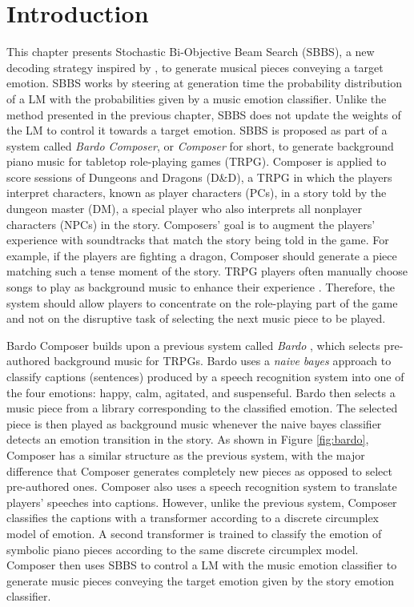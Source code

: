\section{Introduction}

This chapter presents Stochastic Bi-Objective Beam Search (SBBS), a new decoding strategy inspired by \citet{holtzman2018learning}, to generate musical pieces conveying a target emotion. SBBS works by steering at generation time the probability distribution of a LM with the probabilities given by a music emotion classifier. Unlike the method presented in the previous chapter, SBBS does not update the weights of the LM to control it towards a target emotion. SBBS is proposed as part of a system called \textit{Bardo Composer}, or \textit{Composer} for short, to generate background piano music for tabletop role-playing games (TRPG). Composer is applied to score sessions of Dungeons and Dragons (D\&D), a TRPG in which the players interpret characters,
known as player characters (PCs), in a story told by the dungeon master (DM), a special player who also interprets all nonplayer characters (NPCs) in the story. Composers' goal is to augment the players' experience with soundtracks that match the story being told in the game. For example, if the players are fighting a dragon, Composer should generate a piece matching such a tense moment of the story. TRPG players often manually choose songs to play as background music to enhance their experience \cite{bergstrom2014case}. Therefore, the system should allow players to concentrate on the role-playing part of the game and not on the disruptive task of selecting the next music piece to be played.

Bardo Composer builds upon a previous system called \textit{Bardo} \cite{padovani2017}, which selects pre-authored background music for TRPGs. Bardo uses a \textit{naive bayes} approach to classify captions (sentences) produced by a speech recognition system into one of the four emotions: happy, calm, agitated, and suspenseful. Bardo then selects a music piece from a library corresponding to the classified emotion. The selected piece is then played as background music whenever the naive bayes classifier detects an emotion transition in the story.
As shown in Figure \ref{fig:bardo}, Composer has a similar structure as the previous system, with the major difference that Composer generates completely new pieces as opposed to select pre-authored ones. Composer also uses a speech recognition system to translate players' speeches into captions. However, unlike the previous system, Composer classifies the captions with a transformer according to a discrete circumplex model of emotion. A second transformer is trained to classify the emotion of symbolic piano pieces according to the same discrete circumplex model. Composer then uses SBBS to control a LM with the music emotion classifier to generate music pieces conveying the target emotion given by the story emotion classifier.

